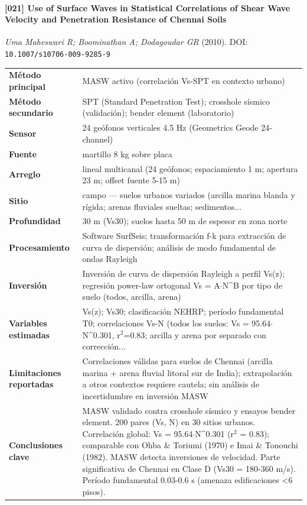 \paragraph{[021] Use of Surface Waves in Statistical Correlations of Shear Wave Velocity and Penetration Resistance of Chennai Soils} \emph{Uma Maheswari R; Boominathan A; Dodagoudar GR} (2010).
{\scriptsize DOI: \texttt{10.1007/s10706-009-9285-9}}

\begin{center}\scriptsize
\begin{tabularx}{\textwidth}{@{}>{\bfseries}p{3.3cm} X@{}}
\toprule
M\'etodo principal & MASW activo (correlación Vs-SPT en contexto urbano) \\
M\'etodo secundario & SPT (Standard Penetration Test); crosshole sísmico (validación); bender element (laboratorio) \\
Sensor & 24 geófonos verticales 4.5 Hz (Geometrics Geode 24-channel) \\
Fuente & martillo 8 kg sobre placa \\
Arreglo & lineal multicanal (24 geófonos; espaciamiento 1 m; apertura 23 m; offset fuente 5-15 m) \\
Sitio & campo --- suelos urbanos variados (arcilla marina blanda y rígida; arenas fluviales sueltas; sedimentos... \\
Profundidad & 30 m (Vs30); suelos hasta 50 m de espesor en zona norte \\
Procesamiento & Software SurfSeis; transformación f-k para extracción de curva de dispersión; análisis de modo fundamental de ondas Rayleigh \\
Inversi\'on & Inversión de curva de dispersión Rayleigh a perfil Vs(z); regresión power-law ortogonal Vs = A$\cdot$N\textasciicircum{}B por tipo de suelo (todos, arcilla, arena) \\
Variables estimadas & Vs(z); Vs30; clasificación NEHRP; período fundamental T0; correlaciones Vs-N (todos los suelos: Vs = 95.64$\cdot$N\textasciicircum{}0.301, r$^2$=0.83; arcilla y arena por separado con corrección... \\
Limitaciones reportadas & Correlaciones válidas para suelos de Chennai (arcilla marina + arena fluvial litoral sur de India); extrapolación a otros contextos requiere cautela; sin análisis de incertidumbre en inversión MASW \\
Conclusiones clave & MASW validado contra crosshole sísmico y ensayos bender element. 200 pares (Vs, N) en 30 sitios urbanos. Correlación global: Vs = 95.64$\cdot$N\textasciicircum{}0.301 (r$^2$ = 0.83); comparable con Ohba \& Toriumi (1970) e Imai \& Tonouchi (1982). MASW detecta inversiones de velocidad. Parte significativa de Chennai en Clase D (Vs30 = 180-360 m/s). Período fundamental 0.03-0.6 s (amenaza edificaciones <6 pisos). \\

\end{tabularx}
\end{center}
